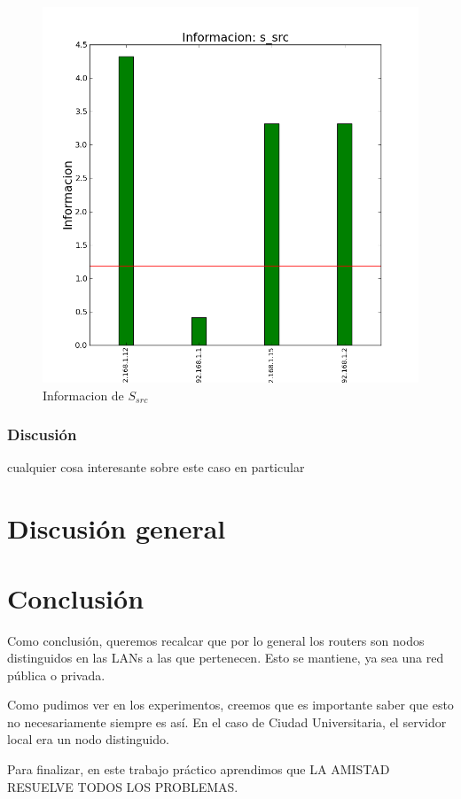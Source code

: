 \documentclass[10pt, a4paper]{article}
\begin{document}
\begin{figure}[H]
\begin{minipage}{0.5\linewidth}
    \includegraphics[width=\linewidth]{../imgs/pruebaFede-ips_s_src_info.png}
    \caption{Informacion de $S_{src}$}\label{fig:Fede-src-info}
  \end{minipage}
\end{figure}

\subsubsection{Discusión}

cualquier cosa interesante sobre este caso en particular

\section{Discusión general}

\section{Conclusión}
Como conclusión, queremos recalcar que por lo general los routers son nodos distinguidos en las LANs a las que pertenecen. Esto se mantiene, ya sea una red pública o privada.

Como pudimos ver en los experimentos, creemos que es importante saber que esto no necesariamente siempre es así. En el caso de Ciudad Universitaria, el servidor local era un nodo distinguido.

Para finalizar, en este trabajo práctico aprendimos que LA AMISTAD RESUELVE TODOS LOS PROBLEMAS.
\end{document}
